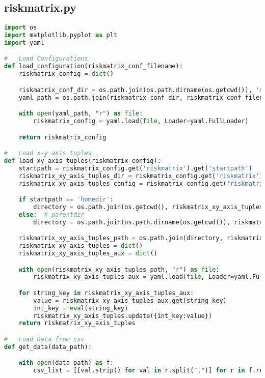 
\subsection{riskmatrix.py}
\lstset{style=gra_codestyle}
\begin{lstlisting}[language=python, caption=Python LaTex - riskmatrix.py - Risxikomatrizen,captionpos=b,label={lst:riskmatrix},breaklines=true]
import os
import matplotlib.pyplot as plt
import yaml

#   Load Configurations
def load_configuration(riskmatrix_conf_filename):
    riskmatrix_config = dict()

    riskmatrix_conf_dir = os.path.join(os.path.dirname(os.getcwd()), 'source', 'configuration')
    yaml_path = os.path.join(riskmatrix_conf_dir, riskmatrix_conf_filename)

    with open(yaml_path, "r") as file:
        riskmatrix_config = yaml.load(file, Loader=yaml.FullLoader)

    return riskmatrix_config

#   Load x-y axis tuples
def load_xy_axis_tuples(riskmatrix_config):
    startpath = riskmatrix_config.get('riskmatrix').get('startpath')
    riskmatrix_xy_axis_tuples_dir = riskmatrix_config.get('riskmatrix').get('configfile_path')
    riskmatrix_xy_axis_tuples_config = riskmatrix_config.get('riskmatrix').get('configfile_name')

    if startpath == 'homedir':
        directory = os.path.join(os.getcwd(), riskmatrix_xy_axis_tuples_dir)
    else:  # parentdir
        directory = os.path.join(os.path.dirname(os.getcwd()), riskmatrix_xy_axis_tuples_dir)

    riskmatrix_xy_axis_tuples_path = os.path.join(directory, riskmatrix_xy_axis_tuples_config)
    riskmatrix_xy_axis_tuples = dict()
    riskmatrix_xy_axis_tuples_aux = dict()

    with open(riskmatrix_xy_axis_tuples_path, "r") as file:
        riskmatrix_xy_axis_tuples_aux = yaml.load(file, Loader=yaml.FullLoader)

    for string_key in riskmatrix_xy_axis_tuples_aux:
        value = riskmatrix_xy_axis_tuples_aux.get(string_key)
        int_key = eval(string_key)
        riskmatrix_xy_axis_tuples.update({int_key:value})
    return riskmatrix_xy_axis_tuples

#   Load Data from csv
def get_data(data_path):

    with open(data_path) as f:
        csv_list = [[val.strip() for val in r.split(",")] for r in f.readlines()]


\end{lstlisting}

